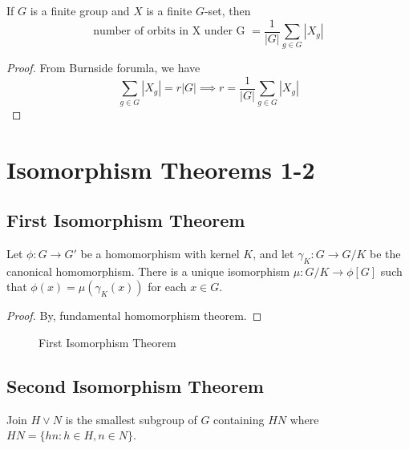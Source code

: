 \begin{corollary}
	If $G$ is a finite group and $X$ is a finite $G$-set, then
	\begin{equation}
		\text{number of orbits in X under G } = \frac{1}{|G|} \sum_{g \in G} |X_g|
	\end{equation}
\end{corollary}
\begin{proof}
	From Burnside forumla, we have
	$$\sum\limits_{g \in G}|X_g| = r|G| \implies r = \frac{1}{|G|} \sum\limits_{g \in G} |X_g|$$
\end{proof}

\section{Isomorphism Theorems 1-2}
\subsection{First Isomorphism Theorem}
\begin{theorem}
	Let $\phi : G \to G'$ be a homomorphism with kernel $K$, and let $\gamma_K : G \to G/K$ be the canonical homomorphism.
	There is a unique isomorphism $\mu : G/K \to \phi[G]$ such that $\phi(x) = \mu(\gamma_K(x))$ for each $x \in G$.
\end{theorem}
\begin{proof}
	By, fundamental homomorphism theorem.\cite[\S14.1]{fraleigh}
\end{proof}
\begin{figure}[h]
	\centering
	\caption{First Isomorphism Theorem}
\end{figure}

\subsection{Second Isomorphism Theorem}
\begin{definition}

	Join $H \vee N$ is the smallest subgroup of $G$ containing $HN$ where $HN = \{ hn : h \in H, n \in N\}$.
\end{definition}


